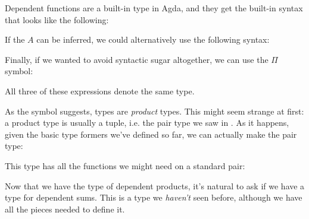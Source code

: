 Dependent functions are a built-in type in Agda, and they get the built-in
syntax that looks like the following:
\begin{agdalisting*}
\end{agdalisting*}
If the \(A\) can be inferred, we could alternatively use the following syntax:
\begin{agdalisting*}
\end{agdalisting*}
Finally, if we wanted to avoid syntactic sugar altogether, we can use the
\(\Pi\) symbol:
\begin{agdalisting*}
\end{agdalisting*}
All three of these expressions denote the same type.

As the symbol suggests, \AgdaFunction{\(\Pi\)} types are \emph{product} types.
This might seem strange at first: a product type is usually a tuple,
i.e. the pair type we saw in .
As it happens, given the basic type formers we've defined so far, we can
actually make the pair type:
\begin{agdalisting*}
\end{agdalisting*}
This type has all the functions we might need on a standard pair:
\begin{multicols}{3}
  \begin{agdalisting*}
  \end{agdalisting*} \columnbreak
  \begin{agdalisting*}
  \end{agdalisting*} \columnbreak
  \begin{agdalisting*}
  \end{agdalisting*}
\end{multicols}

Now that we have the type of dependent products, it's natural to ask if we have
a type for dependent sums.
This is a type we \emph{haven't} seen before, although we have all the pieces
needed to define it.

